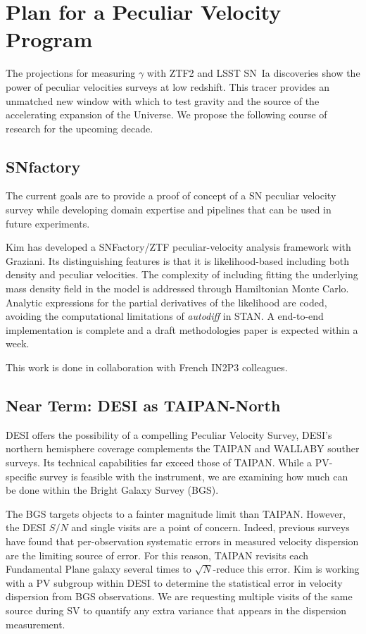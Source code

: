 \section{Plan for a Peculiar Velocity Program}
The projections for measuring $\gamma$ with ZTF2 and LSST SN~Ia discoveries
show the power of peculiar velocities surveys at low redshift.
This  tracer provides an unmatched  new window with which to test gravity and the source of the accelerating expansion of the Universe.
We propose the following course of research for the upcoming decade.

\subsection{SNfactory}
The current goals are to provide a proof of concept of a SN peculiar velocity survey while developing domain
expertise and pipelines that can be used in future experiments.

Kim has developed a SNFactory/ZTF peculiar-velocity analysis framework with Graziani.  Its distinguishing features is that it is likelihood-based
including both density and peculiar velocities.  The complexity of including fitting the underlying mass density field in the model
is addressed through Hamiltonian Monte Carlo.  Analytic expressions for the partial derivatives of the likelihood are coded,
avoiding the computational limitations of {\it autodiff} in STAN.  A end-to-end implementation is complete
and a draft methodologies paper is expected within a week.


This work is done in collaboration with French IN2P3 colleagues.

\subsection{Near Term: DESI as TAIPAN-North}

DESI offers the possibility of a compelling Peculiar Velocity Survey,  DESI's northern hemisphere coverage complements 
the TAIPAN and WALLABY souther surveys.   Its technical capabilities far exceed those of TAIPAN.  While a PV-specific
survey is feasible with the instrument, we are examining how much can be done within the Bright Galaxy Survey (BGS).

The BGS targets objects to a fainter magnitude limit than TAIPAN.  However, the DESI $S/N$ and single visits are a point of concern.
Indeed, previous surveys have found that per-observation systematic errors in measured velocity dispersion are the limiting
source of error.  For this reason, TAIPAN revisits each Fundamental Plane galaxy several times to $\sqrt{N}$-reduce this error.
Kim is working with a PV subgroup within DESI to determine the statistical error in velocity dispersion from BGS observations.
We are requesting multiple visits of the same source during SV to quantify any extra variance that appears in
the dispersion measurement.

